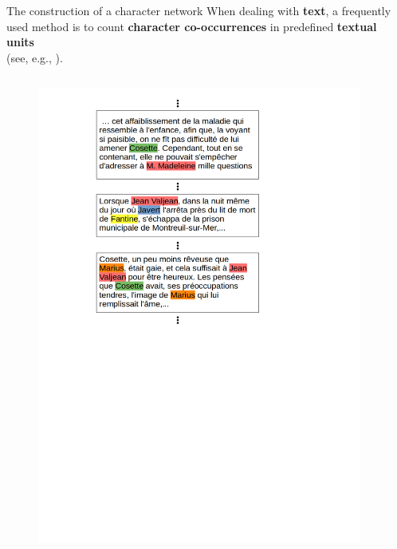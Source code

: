 \documentclass[10pt]{beamer}
\newcommand{\imp}[1]{\textbf{\color{cyan}#1}}
\begin{document}
	\begin{frame}{The construction of a character network}
		When dealing with \imp{text}, a frequently used method is to count \imp{character co-occurrences} in predefined \imp{textual units} \\(see, e.g., \cite{elsner_character-based_2012, rochat_analyse_2014}). \\
		\vspace{-0.4cm}
		\begin{columns}
			\begin{column}{0.5\textwidth}
				\begin{figure}
					\centering
					\includegraphics[width=1.4\textwidth]{img/textual_units.png}
				\end{figure}
			\end{column}
			\begin{column}{0.5\textwidth}
				\vspace{-4cm}

\end{column}
\end{columns}
\end{frame}
\end{document}
